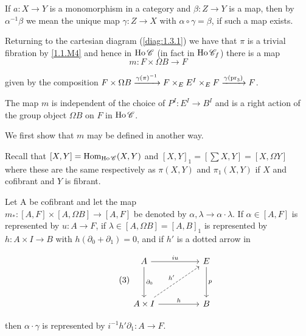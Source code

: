 \documentclass[../main]{subfiles}
\begin{document}
\begin{conv}
If $a:X \longrightarrow Y$ is a monomorphism in a category and $\beta:Z\longrightarrow Y$ is a map, then by $\alpha^{-1}\beta$ we mean the unique map $\gamma:Z \longrightarrow X$ with $\alpha \circ \gamma = \beta$, if such a map exists.
\end{conv}

Returning to the cartesian diagram (\ref{diag:1.3.1}) we have that $\pi$ is a trivial fibration by \ref{1.1.M4} and hence in $\operatorname{Ho} \mathscr{C}$ (in fact in $\operatorname{Ho} \mathscr{C}_f$) there is a map
\[\tag{2}\label{eq:1.3.2}
m:F \times \Omega B \longrightarrow F
\]

given by the composition $F \times \Omega B \varrightarrow{\gamma(\pi)^{-1}} F \times_E E^I \times_E F \varrightarrow{\gamma(\pr_3)}F$.

\begin{proposition}\label{prop:1.3.1}
The map $m$ is independent of the choice of $P^I:E^I \longrightarrow B^I$ and is a right action of the group object $\Omega B$ on $F$ in $\operatorname{Ho} \mathscr{C}$.
\end{proposition}

We first show that $m$ may be defined in another way.

Recall that $[X,Y] = \operatorname{Hom}_{\operatorname{Ho} \mathscr{C}}(X,Y)$ and $[X,Y]_1= [\sum X,Y] = [X, \Omega Y]$ where these are the same respectively as $\pi(X,Y)$ and $\pi_1(X,Y)$ if $X$ and cofibrant and $Y$ is fibrant.

\begin{proposition}\label{prop:1.3.2}
Let A be cofibrant and let the map\\ $m_*:[A,F]\times[A,\Omega B] \longrightarrow [A,F]$ be denoted by $\alpha, \lambda \longrightarrow \alpha \cdot \lambda$.  If $\alpha \in [A,F]$ is represented by $u:A \longrightarrow F$, if $\lambda \in [A,\Omega B] = [A,B]_1$ is represented by $h:A \times I \longrightarrow B$ with $h(\partial_0 + \partial_1) = 0$, and if $h'$ is a dotted arrow in

\[\tag{3}\label{diag:1.3.3}\begin{tikzcd}
    A && E \\ \\
    A \times I && B
    \arrow["\partial_0", from=1-1, to=3-1]
    \arrow["p", from=1-3, to=3-3]
    \arrow["iu", from=1-1, to=1-3]
    \arrow["h", from=3-1, to=3-3]
    \arrow["h'", dashed, from=3-1, to=1-3]
\end{tikzcd}\]

then $\alpha \cdot \gamma $ is represented by $i^{-1}h'\partial_1:A \longrightarrow F$.
\end{proposition}
\end{document}
